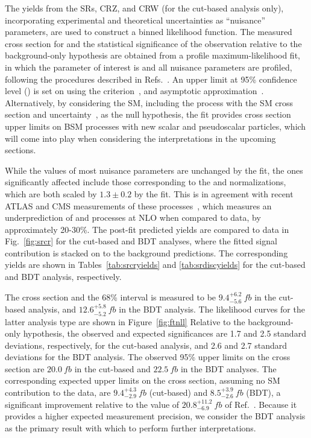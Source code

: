 The yields from the SRs, CRZ, and CRW (for the cut-based analysis only),
incorporating experimental and theoretical uncertainties as ``nuisance''
parameters, are used to construct a binned likelihood function.
The measured cross
section for \tttt and the statistical significance of the observation relative to the
background-only hypothesis are obtained from a profile maximum-likelihood
fit, in which the parameter of interest is \xsectttt and all nuisance
parameters are profiled, following the procedures described in
Refs.~\cite{STAT:ATLPHYSPUB2011011,STAT:PDG}. 
An upper limit at 95\%
confidence level (\CL) is set on \xsectttt using the 
\CLs criterion~\cite{STAT:Junk1999kv,STAT:Read2002hq}, 
and asymptotic approximation~\cite{STAT:Cowan2010js}. 
Alternatively, by considering the SM, including the \tttt process with the SM
cross section and uncertainty~\cite{THEORY:Frederix2017wme}, as the null
hypothesis, the fit provides cross section upper limits on BSM processes with
new scalar and pseudoscalar particles, which will come into play when
considering the interpretations in the upcoming sections.

While the values of most nuisance parameters are unchanged by the
fit, the ones significantly affected include those corresponding to the
\ttW and \ttZ normalizations, which are both scaled by $1.3\pm0.2$ by the
fit. This is in agreement with recent ATLAS and CMS measurements of these
processes~\cite{ATLAS:Aaboud2019njj, CMS:Sirunyan2017uzs, CMS:2019too}, which
measures an underprediction of \ttW and \ttZ processes at NLO when compared to
data, by approximately 20-30\%. The
post-fit predicted yields are compared to
data in Fig.~\ref{fig:srcr} for the cut-based and BDT 
analyses, where the fitted \tttt signal contribution is stacked on to the
background predictions. The corresponding yields are shown in
Tables~\ref{tab:srcryields} and \ref{tab:srdiscyields} for the cut-based and
BDT analysis, respectively.

The \tttt cross section and the 68\% \CL interval is measured to be
$9.4^{+6.2}_{-5.6}~\unit{fb}$ in the cut-based analysis, and
$12.6^{+5.8}_{-5.2}~\unit{fb}$ in the BDT analysis. The likelihood
curves for the latter analysis type are shown in 
Figure~\ref{fig:ftnll}
Relative to the
background-only hypothesis, the observed and expected significances are 1.7
and 2.5 standard deviations, respectively, for the cut-based analysis, and
2.6 and 2.7 standard deviations for the BDT analysis. The observed 95\% \CL
upper limits on the cross section are $20.0~\unit{fb}$ in the cut-based and
$22.5~\unit{fb}$ in the BDT analyses. The corresponding expected upper limits
on the \tttt cross section, assuming no SM \tttt contribution to the data,
are $9.4^{+4.3}_{-2.9}~\unit{fb}$ (cut-based) and $8.5^{+3.9}_{-2.6}~\unit{fb}$
(BDT), a significant improvement relative to the value of
$20.8^{+11.2}_{-6.9}~\unit{fb}$ of Ref.~\cite{CMS:myTOP2016}. Because it 
provides a higher expected measurement precision, we consider the BDT
analysis as the primary result with which to perform further interpretations.

